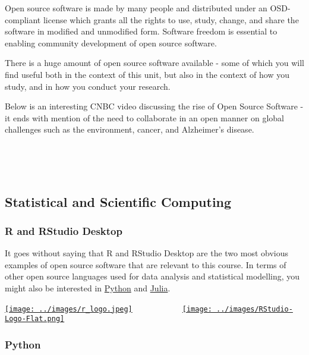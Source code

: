 \documentclass[
]{book}
\begin{document}
Open source software is made by many people and distributed under an OSD-compliant license which grants all the rights to use, study, change, and share the software in modified and unmodified form. Software freedom is essential to enabling community development of open source software.

There is a huge amount of open source software available - some of which you will find useful both in the context of this unit, but also in the context of how you study, and in how you conduct your research.

Below is an interesting CNBC video discussing the rise of Open Source Software - it ends with mention of the need to collaborate in an open manner on global challenges such as the environment, cancer, and Alzheimer's disease.

~~

~~

\hypertarget{statistical-and-scientific-computing}{%
\subsection{Statistical and Scientific Computing}\label{statistical-and-scientific-computing}}

\hypertarget{r-and-rstudio-desktop}{%
\subsubsection*{R and RStudio Desktop}\label{r-and-rstudio-desktop}}

It goes without saying that R and RStudio Desktop are the two most obvious examples of open source software that are relevant to this course. In terms of other open source languages used for data analysis and statistical modelling, you might also be interested in \href{https://www.python.org}{Python} and \href{https://julialang.org/}{Julia}.

\href{https://www.r-project.org}{\texttt{[image: ../images/r\_logo.jpeg]}}~~~~~~~~~~~~\href{https://posit.co/products/open-source/rstudio}{\texttt{[image: ../images/RStudio-Logo-Flat.png]}}

\hypertarget{python}{%
\subsubsection*{Python}\label{python}}
\end{document}
